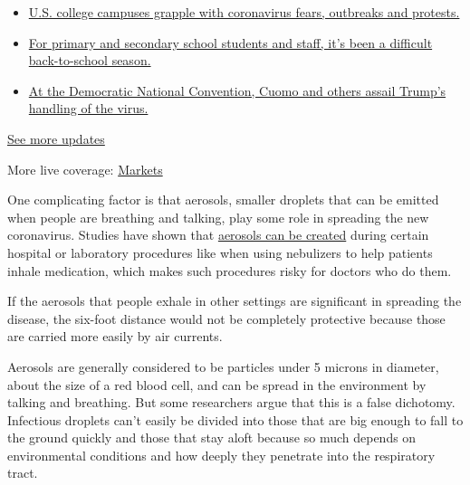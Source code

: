 \begin{itemize}
\tightlist
\item
  \href{https://www.nytimes.com/2020/08/17/world/coronavirus-covid.html?action=click\&pgtype=Article\&state=default\&region=MAIN_CONTENT_1\&context=storylines_live_updates\#link-6fdbc8ef}{U.S.
  college campuses grapple with coronavirus fears, outbreaks and
  protests.}
\item
  \href{https://www.nytimes.com/2020/08/17/world/coronavirus-covid.html?action=click\&pgtype=Article\&state=default\&region=MAIN_CONTENT_1\&context=storylines_live_updates\#link-7e47207}{For
  primary and secondary school students and staff, it's been a difficult
  back-to-school season.}
\item
  \href{https://www.nytimes.com/2020/08/17/world/coronavirus-covid.html?action=click\&pgtype=Article\&state=default\&region=MAIN_CONTENT_1\&context=storylines_live_updates\#link-44c3fee2}{At
  the Democratic National Convention, Cuomo and others assail Trump's
  handling of the virus.}
\end{itemize}

\href{https://www.nytimes.com/2020/08/17/world/coronavirus-covid.html?action=click\&pgtype=Article\&state=default\&region=MAIN_CONTENT_1\&context=storylines_live_updates}{See
more updates}

More live coverage:
\href{https://www.nytimes.com/live/2020/08/17/business/stock-market-today-coronavirus?action=click\&pgtype=Article\&state=default\&region=MAIN_CONTENT_1\&context=storylines_live_updates}{Markets}

One complicating factor is that aerosols, smaller droplets that can be
emitted when people are breathing and talking, play some role in
spreading the new coronavirus. Studies have shown that
\href{https://www.nejm.org/doi/10.1056/NEJMc2004973}{aerosols can be
created} during certain hospital or laboratory procedures like when
using nebulizers to help patients inhale medication, which makes such
procedures risky for doctors who do them.

If the aerosols that people exhale in other settings are significant in
spreading the disease, the six-foot distance would not be completely
protective because those are carried more easily by air currents.

Aerosols are generally considered to be particles under 5 microns in
diameter, about the size of a red blood cell, and can be spread in the
environment by talking and breathing. But some researchers argue that
this is a false dichotomy. Infectious droplets can't easily be divided
into those that are big enough to fall to the ground quickly and those
that stay aloft because so much depends on environmental conditions and
how deeply they penetrate into the respiratory tract.

